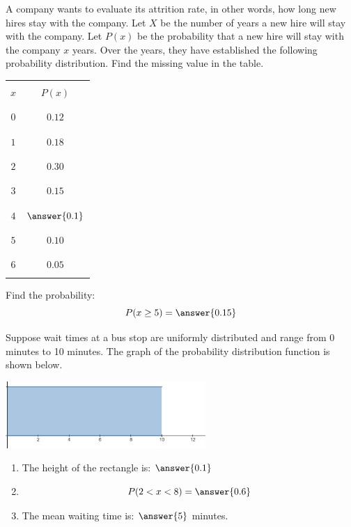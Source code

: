 \documentclass{ximera}
\begin{document}
\begin{problem}\label{prob:exam2prob4}
A company wants to evaluate its attrition rate, in other words, how long new hires stay with the company. Let $X$ be the number of years a new hire will stay with the company.
Let $P(x)$ be the probability that a new hire will stay with the company $x$ years.  Over the years, they have established the following probability
distribution.  Find the missing value in the table.
\begin{center}
\begin{tabular}{|c|c|}
 \hline
 & \\
 $x$&$P(x)$\\
 & \\
 \hline
  & \\
 $0$&$0.12$\\
 & \\
 \hline
 & \\
 $1$&$0.18$\\
 & \\
 \hline
  & \\
 $2$&$0.30$\\
 & \\
 \hline
  & \\
 $3$&$0.15$\\
 & \\
 \hline
  & \\
 $4$&$\answer{0.1}$\\
 & \\
 \hline
  & \\
 $5$&$0.10$\\
 & \\
 \hline
  & \\
 $6$&$0.05$\\
 & \\
 \hline
\end{tabular}
\end{center}
Find the probability:
$$P(x\geq 5)=\answer{0.15}$$

\end{problem}

\begin{problem}\label{prob:exam2prob5}
Suppose wait times at a bus stop are uniformly distributed and range from 0 minutes to 10 minutes.  The graph of the probability distribution function is shown below.
\begin{image}
\includegraphics[height=1in]{test2waittime.JPG}
\end{image}
\begin{enumerate}
    \item The height of the rectangle is: $\answer{0.1}$
    \item 
    $$P(2<x<8)=\answer{0.6}$$
    \item 
    The mean waiting time is: $\answer{5}$ minutes.
\end{enumerate}
\end{problem}
\end{document}
